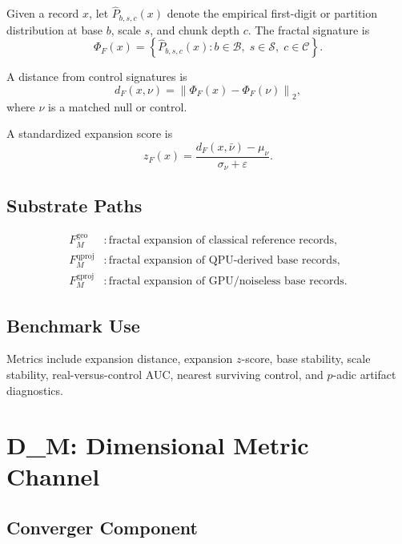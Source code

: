 \documentclass[11pt]{article}
\newcommand{\norm}[1]{\left\lVert #1 \right\rVert}
\newcommand{\Fm}{F_M}
\newcommand{\geo}{\mathrm{geo}}
\newcommand{\qproj}{\mathrm{qproj}}
\newcommand{\gproj}{\mathrm{gproj}}
\begin{document}
Given a record \(x\), let \(\widehat{P}_{b,s,c}(x)\) denote the empirical
first-digit or partition distribution at base \(b\), scale \(s\), and chunk
depth \(c\). The fractal signature is
\begin{equation}
  \Phi_F(x) =
  \left\{
    \widehat{P}_{b,s,c}(x)
    :
    b\in\mathcal{B},\;
    s\in\mathcal{S},\;
    c\in\mathcal{C}
  \right\}.
\end{equation}

A distance from control signatures is
\begin{equation}
  d_F(x,\nu) =
  \norm{\Phi_F(x)-\Phi_F(\nu)}_2,
\end{equation}
where \(\nu\) is a matched null or control.

A standardized expansion score is
\begin{equation}
  z_F(x) =
  \frac{
    d_F(x,\bar{\nu}) - \mu_{\nu}
  }{
    \sigma_{\nu}+\varepsilon
  }.
\end{equation}

\subsection{Substrate Paths}

\begin{align}
  \Fm^{\geo}   &: \text{fractal expansion of classical reference records},\\
  \Fm^{\qproj} &: \text{fractal expansion of QPU-derived base records},\\
  \Fm^{\gproj} &: \text{fractal expansion of GPU/noiseless base records}.
\end{align}

\subsection{Benchmark Use}

Metrics include expansion distance, expansion \(z\)-score, base stability,
scale stability, real-versus-control AUC, nearest surviving control, and
\(p\)-adic artifact diagnostics.

\section{D\_M: Dimensional Metric Channel}

\subsection{Converger Component}
\end{document}
